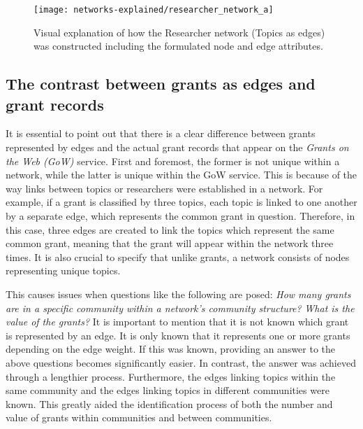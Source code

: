 \begin{figure}[htpb]
    \centering
    \texttt{[image: networks-explained/researcher\_network\_a]}
    \caption{Visual explanation of how the Researcher network (Topics as edges) was constructed including the formulated node and edge attributes.}
    \label{fig:researcher_b_structure}
\end{figure}

\subsection{The contrast between grants as edges and grant records}

It is essential to point out that there is a clear difference between grants represented by edges and the actual grant records that appear on the \textit{Grants on the Web (GoW)} service. First and foremost, the former is not unique within a network, while the latter is unique within the GoW service. This is because of the way links between topics or researchers were established in a network. For example, if a grant is classified by three topics, each topic is linked to one another by a separate edge, which represents the common grant in question. Therefore, in this case, three edges are created to link the topics which represent the same common grant, meaning that the grant will appear within the network three times. It is also crucial to specify that unlike grants, a network consists of nodes representing unique topics.

This causes issues when questions like the following are posed: \textit{How many grants are in a specific community within a network's community structure?} \textit{What is the value of the grants?} It is important to mention that it is not known which grant is represented by an edge. It is only known that it represents one or more grants depending on the edge weight. If this was known, providing an answer to the above questions becomes significantly easier. In contrast, the answer was achieved through a lengthier process. Furthermore, the edges linking topics within the same community and the edges linking topics in different communities were known. This greatly aided the identification process of both the number and value of grants within communities and between communities.

